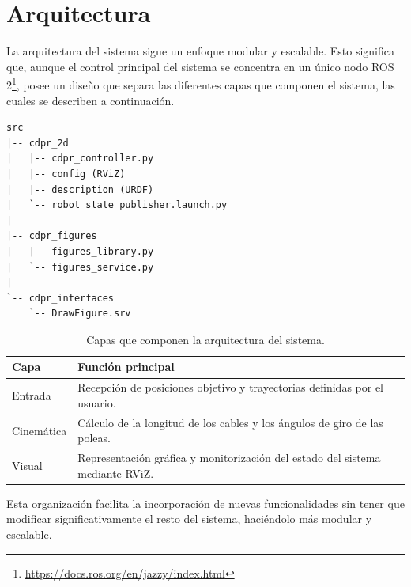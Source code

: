 \section{Arquitectura}
\label{sec:segundaseccion}

La arquitectura del sistema sigue un enfoque modular y escalable. Esto significa que, aunque el control principal del sistema se concentra en un único nodo ROS 2\footnote{\url{https://docs.ros.org/en/jazzy/index.html}}, posee un diseño que separa las diferentes capas que componen el sistema, las cuales se describen a continuación.

\begin{code}[h]
\begin{lstlisting}
src
|-- cdpr_2d
|   |-- cdpr_controller.py
|   |-- config (RViZ)
|   |-- description (URDF)
|   `-- robot_state_publisher.launch.py
|
|-- cdpr_figures
|   |-- figures_library.py
|   `-- figures_service.py
|
`-- cdpr_interfaces
    `-- DrawFigure.srv
\end{lstlisting}
\caption[Estructura del workspace ROS 2.]{Estructura del workspace ROS 2.}
\end{code}

\begin{table}[htbp]
    \centering
    \label{tab:mi_tabla}
    \begin{tabularx}{\textwidth}{@{}X X @{}}
        \toprule
        Capa & Función principal \\
        \midrule
        Entrada & Recepción de posiciones objetivo y trayectorias definidas por el usuario.\newline \\
        Cinemática & Cálculo de la longitud de los cables y los ángulos de giro de las poleas.\newline \\
        Visual & Representación gráfica y monitorización del estado del sistema mediante RViZ.\\
        \bottomrule
    \end{tabularx}
    \caption{Capas que componen la arquitectura del sistema.}
\end{table}

\newpage

Esta organización facilita la incorporación de nuevas funcionalidades sin tener que modificar significativamente el resto del sistema, haciéndolo más modular y escalable.

\vspace{0.25cm}

